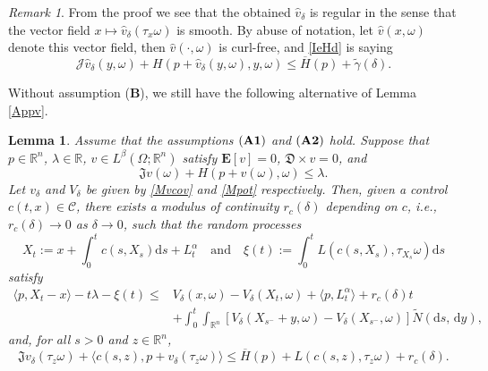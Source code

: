 \documentclass[11pt,reqno]{amsart}
\newtheorem{lem}[thm]{Lemma}
\theoremstyle{definition}
\theoremstyle{remark}
\newtheorem{rem}{Remark}[section]
\numberwithin{equation}{section}
\newcommand{\R}{{\mathbb{R}}}
\newcommand{\ol}{\overline}
\begin{document}
\begin{rem} From the proof we see that the obtained $\hat{v}_\delta$ is regular in the sense that the vector field $x\mapsto \hat{v}_\delta(\tau_x \omega)$ is smooth. By abuse of notation, let $\hat{v}(x,\omega)$ denote this vector field, then $\hat{v}(\cdot,\omega)$ is curl-free, and \eqref{IeHd} is saying
\begin{equation}
\label{eq:vdeleq-1}
    \mathscr{J}\hat{v}_\delta(y,\omega) + H(p+\hat{v}_\delta(y,\omega),y,\omega) \le \ol{H}(p) + \widetilde\gamma(\delta).
\end{equation}
\end{rem}

Without assumption ({\bf B}), we still have the following alternative of Lemma \ref{Appv}.

\begin{lem}\label{vVcompaison}
Assume that the assumptions $(\bf{A1})$ and $(\bf{A2})$ hold. Suppose that $p\in\mathbb{R}^{n}$, $\lambda \in \mathbb{R}$, $v \in L^{\beta}(\Omega;\R^n)$ satisfy $\mathbf{E}[v] = 0$, $\mathfrak{D}\times v = 0$, and
\begin{equation}\label{supersol11}
    \mathfrak{J} v(\omega) + H(p + v(\omega), \omega) \leq \lambda.
\end{equation}
Let $v_\delta$ and $V_{\delta}$ be given by  \eqref{Mvcov} and \eqref{Mpot} respectively. Then, given a control $c(t,x)\in \mathscr{C}$, there exists a modulus of continuity $r_{c}(\delta)$ depending on $c$, i.e., $r_c(\delta) \to 0$ as $\delta \to 0$, such that the random processes
\begin{equation*}
    X_{t} := x + \int^{t}_{0} c(s,X_{s}) \mathrm{d}s + L^{\alpha}_{t} \quad\text{and}\quad \xi(t) := \int^{t}_0 L(c(s,X_{s}),\tau_{X_{s}}\omega)\mathrm{d}s
\end{equation*}
satisfy
\begin{align}\label{El44}
    \langle p, X_{t} - x \rangle - t\lambda - \xi(t) \leq & V_{\delta}(x,\omega) - V_{\delta}(X_{t},\omega) + \langle p, L^{\alpha}_{t} \rangle + r_{c}(\delta)t \nonumber\\
    & +\int_{0}^{t} \int_{\mathbb{R}^n} [V_{\delta}(X_{s^{-}}+ y,\omega)-V_{\delta}(X_{s^{-}},\omega)]\widetilde{N}(\mathrm{d}s,\,\mathrm{d}y),
\end{align}
and, for all $s>0$ and $z\in \R^n$,
\begin{equation}
    \label{eq:l54-main}
\mathfrak{J}v_\delta(\tau_z \omega) + \langle c(s,z),p+v_\delta(\tau_z \omega) \rangle \le \ol{H}(p) + L(c(s,z),\tau_z\omega) + r_c(\delta).
\end{equation}
\end{lem}
\end{document}

